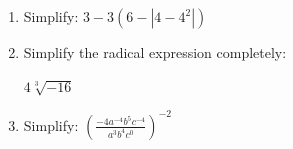\documentclass[11pt]{article}
\begin{document}
\begin{enumerate}

% 

\item %
\providecommand{\stxKnowl}{}\renewcommand{\stxKnowl}[1]{#1}
\providecommand{\stxOuttro}{}\renewcommand{\stxOuttro}[1]{#1}
\providecommand{\stxTitle}{}\renewcommand{\stxTitle}[1]{#1}
\renewcommand{\stxOuttro}[1]{}
\stxKnowl{
 Simplify: \(3 - 3( 6 - |4 - 4^2| )\) 

\stxOuttro{
SOLUTION

 \(3 - 3( 6 - |4 - 4^2| )\) 

 \(= 3 - 3( 6 - |4 - 16| )\) 

 \(= 3 - 3( 6 - |-12| )\) 

 \(= 3 - 3( 6 - 12 )\) 

 \(= 3 - 3( -6 )\) 

 \(= 3 - ( -18 )\) 

 \(= \boxed{ 21 }\) 

}
}

\newpage

% 

\item %
\providecommand{\stxKnowl}{}\renewcommand{\stxKnowl}[1]{#1}
\providecommand{\stxOuttro}{}\renewcommand{\stxOuttro}[1]{#1}
\providecommand{\stxTitle}{}\renewcommand{\stxTitle}[1]{#1}
\renewcommand{\stxOuttro}[1]{}
\stxKnowl{
 Simplify the radical expression completely: 

 \(4 \sqrt[3]{ -16 }\) 

\stxOuttro{
SOLUTION

 \(4 \sqrt[3]{ -16 }\) 

 \(= 4 \cdot \sqrt[3]{ -8 \cdot 2 }\) 

 \(= 4 \cdot (-2) \sqrt[3]{ 2 }\) 

 \(= \boxed{ -8 \sqrt[3]{ 2 } }\) 

}
}

\newpage

% 

\item %
\providecommand{\stxKnowl}{}\renewcommand{\stxKnowl}[1]{#1}
\providecommand{\stxOuttro}{}\renewcommand{\stxOuttro}[1]{#1}
\providecommand{\stxTitle}{}\renewcommand{\stxTitle}[1]{#1}
\renewcommand{\stxOuttro}[1]{}
\stxKnowl{
 Simplify: \(\displaystyle \left( \frac{ -4 a^{-4} b^{5} c^{-4} }{ a^{3} b^{4} c^{0} } \right)^{ -2 }\) 

}
\end{enumerate}
\end{document}
